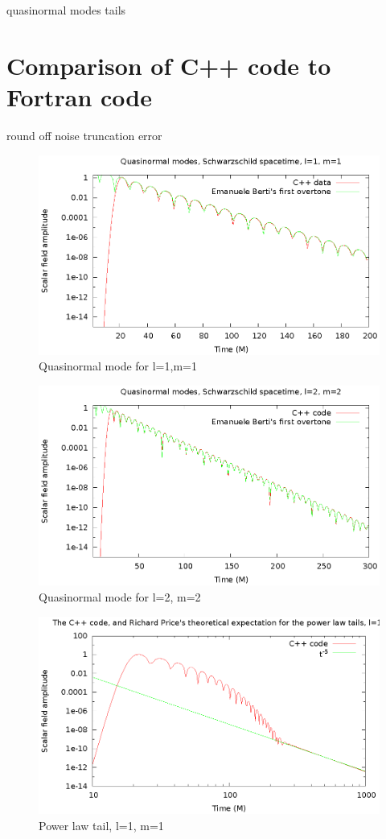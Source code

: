 quasinormal modes
tails

\section{Comparison of C++ code to Fortran code}
round off noise
truncation error

\begin{figure}
  \includegraphics{l1m1qnm}
  \caption{Quasinormal mode for l=1,m=1}
  \end{figure}

\begin{figure}
  \includegraphics{l2m2qnm}
  \caption{Quasinormal mode for l=2, m=2}
\end{figure}

\begin{figure}
  \includegraphics{l1m1tail2}
  \caption{Power law tail, l=1, m=1}
\end{figure}

